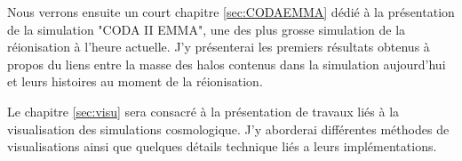 Nous verrons ensuite un court chapitre \ref{sec:CODAEMMA} dédié à la présentation de la simulation "CODA II EMMA", une des plus grosse simulation de la réionisation à l'heure actuelle.
J'y présenterai les premiers résultats obtenus à propos du liens entre la masse des halos contenus dans la simulation aujourd'hui et leurs histoires au moment de la réionisation.


Le chapitre \ref{sec:visu} sera consacré à la présentation de travaux liés à la visualisation des simulations cosmologique.
J'y aborderai différentes méthodes de visualisations ainsi que quelques détails technique liés a leurs implémentations.



%

%
%

%
%
%
%
